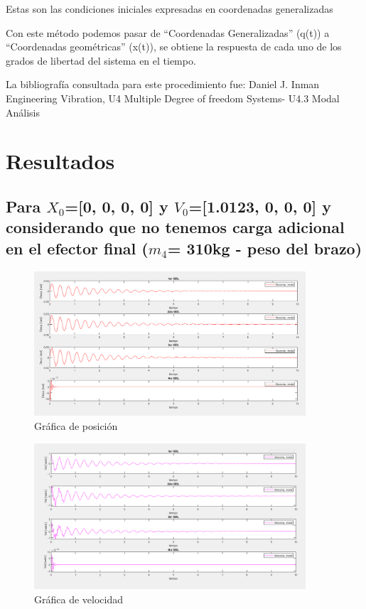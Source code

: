 \documentclass{aleph-revista}
\begin{document}
Estas son las condiciones iniciales expresadas en coordenadas generalizadas

Con este método podemos pasar de “Coordenadas Generalizadas” (q(t)) a “Coordenadas geométricas” (x(t)), se obtiene la respuesta de cada uno de los grados de libertad del sistema en el tiempo.

La bibliografía consultada para este procedimiento fue: Daniel J. Inman Engineering Vibration, U4 Multiple Degree of freedom Systems- U4.3 Modal Análisis

\section{Resultados}

\subsection{Para $X_0$=[0, 0, 0, 0] y $V_0$=[1.0123, 0, 0, 0] y considerando que no tenemos carga adicional en el efector final ($m_4$= 310kg - peso del brazo)}
\begin{figure}[H]
    \centering
    \includegraphics[width=0.90\textwidth]{Imagenes/r1.png}
    \caption{Gráfica de posición}
    \label{fig:etiqueta de la figura}
\end{figure}

\begin{figure}[H]
    \centering
    \includegraphics[width=0.90\textwidth]{Imagenes/r2.png}
    \caption{Gráfica de velocidad}
    \label{fig:etiqueta de la figura}
\end{figure}
\end{document}
